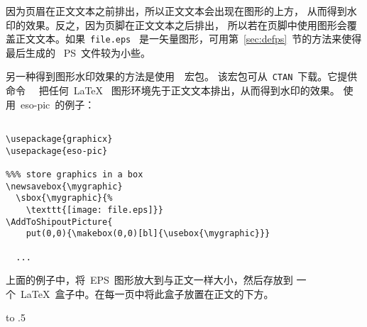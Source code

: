 因为页眉在正文文本之前排出，所以正文文本会出现在图形的上方，
从而得到水印的效果。反之，因为页脚在正文文本之后排出，
所以若在页脚中使用图形会覆盖正文文本。如果~\texttt{file.eps}~
是一矢量图形，可用第~\ref{sec:defps}~节的方法来使得最后生成的
~PS~文件较为小些。

另一种得到图形水印效果的方法是使用~~宏包。
该宏包可从~\texttt{CTAN}~下载。它提供命令~~
把任何~\LaTeX{}~
图形环境先于正文文本排出，从而得到水印的效果。
使用~\textsf{eso-pic}~的例子：

\begin{Verbatim}

\usepackage{graphicx}
\usepackage{eso-pic}

%%% store graphics in a box
\newsavebox{\mygraphic}
  \sbox{\mygraphic}{%
    \texttt{[image: file.eps]}}
\AddToShipoutPicture{
    put(0,0){\makebox(0,0)[bl]{\usebox{\mygraphic}}}

  ...

\end{Verbatim}

上面的例子中，将~EPS~图形放大到与正文一样大小，然后存放到
一个~\LaTeX{}~盒子中。在每一页中将此盒子放置在正文的下方。

\clearpage
\vbox to .5\textheight{\mbox{}}
\clearpage

\endinput